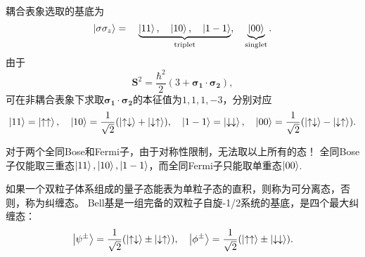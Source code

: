 耦合表象选取的基底为
\begin{equation}
    \ket{\sigma \sigma_z} = \quad \underbrace{\ket{11}, \quad \ket{10}, \quad \ket{1-1}}_{\text{triplet}}, \quad \underbrace{\ket{00}}_{\text{singlet}}.
\end{equation}
由于
\begin{equation}
    \bm{S}^2 = \frac{\hbar^2}{2}(3+\bm{\sigma_1}\cdot\bm{\sigma_2}),
\end{equation}
可在非耦合表象下求取$\bm{\sigma_1}\cdot\bm{\sigma_2}$的本征值为$1,1,1,-3$，分别对应
\begin{equation}
    \ket{11}=\ket{\uparrow\uparrow},\quad \ket{10}=\frac{1}{\sqrt{2}}(\ket{\uparrow\downarrow}+\ket{\downarrow\uparrow}),\quad \ket{1-1}=\ket{\downarrow\downarrow}, \quad \ket{00}=\frac{1}{\sqrt{2}}(\ket{\uparrow\downarrow}-\ket{\downarrow\uparrow}).
\end{equation}

对于两个全同Bose和Fermi子，由于对称性限制，无法取以上所有的态！
全同Bose子仅能取三重态$\ket{11}, \ket{10}, \ket{1-1}$，而全同Fermi子只能取单重态$\ket{00}$.

如果一个双粒子体系组成的量子态能表为单粒子态的直积，则称为可分离态，否则，称为纠缠态。
Bell基是一组完备的双粒子自旋-1/2系统的基底，是四个最大纠缠态：
\begin{equation}
    \ket{\psi^{\pm}}=\frac{1}{\sqrt{2}}(\ket{\uparrow\downarrow}\pm\ket{\downarrow\uparrow}),\quad
    \ket{\phi^{\pm}}=\frac{1}{\sqrt{2}}(\ket{\uparrow\uparrow}\pm\ket{\downarrow\downarrow}).
\end{equation}
